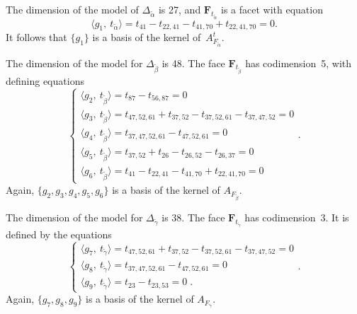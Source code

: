 \documentclass[aos,noinfoline]{imsart}
\def\<{\langle}
\def\>{\rangle}
\newcommand{\Fbf}{\mathbf{F}}
\theoremstyle{remark}
\theoremstyle{definition}
\begin{document}
The dimension of the model of $\Delta_{\tilde{\alpha}}$ is 27,
and $\Fbf_{t_{\tilde{\alpha}}}$ is a facet with equation
\begin{equation} 
  \label{eq:face1}
  \<g_1,\  t_{\tilde{\alpha}} \> =t_{41}-t_{22,41}-t_{41,70}+t_{22,41,70} = 0.
\end{equation}
It follows that $\{g_1\}$ is a basis of the kernel of~$A_{F_{\tilde{\alpha}}}^{t}$.

The dimension of the model for $\Delta_{\tilde{\beta}}$ is 48.
The face $\Fbf_{t_{\tilde{\beta}}}$ has codimension~5, with defining equations
\begin{equation} 
  \label{eq:face2}
  \begin{cases}
    \<g_2,\  t_{\tilde{\beta}} \> =t_{87}-t_{56,87}=0 \\
    \<g_3,\  t_{\tilde{\beta}} \> = t_{47,52,61}+t_{37,52}-t_{37,52,61}-t_{37,47,52}=0\\
    \<g_4,\  t_{\tilde{\beta}} \> =t_{37, 47 ,52,61}-t_{ 47 ,52,61}=0  \\
    \<g_5,\  t_{\tilde{\beta}} \> =t_{37,52}+t_{26}-t_{26,52}-t_{26,37}=0 \\
    \<g_6,\  t_{\tilde{\beta}} \> =t_{41}-t_{22,41}-t_{41,70}+t_{22,41,70}=0 
  \end{cases}.
\end{equation}
Again, $\{g_2,g_3,g_4,g_5,g_6\}$ is a basis of the kernel of $A_{F_{\tilde{\beta}}}$.

The dimension of the model for $\Delta_{\tilde{\gamma}}$ is 38.
The face $\Fbf_{t_{\tilde{\gamma}}}$ has codimension~3.  It is defined by the equations
\begin{equation} 
  \label{eq:face3}
  \begin{cases}
    \<g_7,\  t_{\tilde{\gamma}} \> = t_{47,52,61}+t_{37,52}-t_{37,52,61}-t_{37,47,52}=0 \\
    \<g_8,\  t_{\tilde{\gamma}} \>  =t_{37, 47 ,52,61}-t_{ 47 ,52,61}=0 \\
    \<g_9,\  t_{\tilde{\gamma}} \> =t_{23}-t_{23,53}=0\;. 
  \end{cases}.
\end{equation}
Again, $\{g_7,g_8,g_9\}$ is a basis of the kernel of $A_{F_{\tilde{\gamma}}}$.
\end{document}
